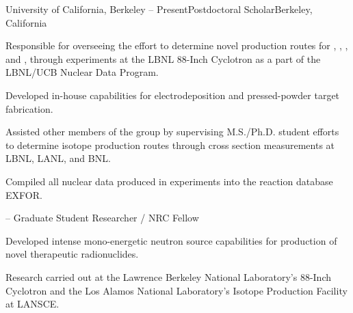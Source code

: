 \begin{rSubsection}{University of California, Berkeley}{ -- Present}{Postdoctoral Scholar}{Berkeley, California}
\item Responsible for overseeing the effort to determine novel production routes for , , , and , through experiments at the LBNL 88-Inch Cyclotron as a part of the LBNL/UCB Nuclear Data Program.
\item Developed in-house capabilities for electrodeposition and  pressed-powder target fabrication.
\item Assisted other members of the group by supervising M.S./Ph.D. student efforts to determine isotope production routes through cross section measurements at LBNL, LANL, and BNL.
\item Compiled all nuclear data produced in  experiments into the reaction database EXFOR. 
\end{rSubsection}\vspace{-1.5\baselineskip}
\begin{rSubsection}{}{ -- }{Graduate Student Researcher / NRC Fellow}{}
  \fi 
{}  \else \fi
\item  Developed intense mono-energetic neutron source capabilities for production of novel therapeutic radionuclides.
\item  Research carried out at 
the Lawrence Berkeley National Laboratory's 88-Inch Cyclotron and the Los Alamos National Laboratory's  Isotope Production Facility at LANSCE.
\end{rSubsection}

